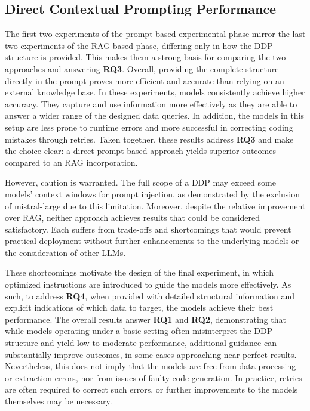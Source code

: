 \documentclass{DESSThesis}
\begin{document}
\subsection{Direct Contextual Prompting Performance}

The first two experiments of the prompt-based experimental phase mirror the last two experiments of the RAG-based phase, differing only in how the DDP structure is provided. This makes them a strong basis for comparing the two approaches and answering \textbf{RQ3}. Overall, providing the complete structure directly in the prompt proves more efficient and accurate than relying on an external knowledge base. In these experiments, models consistently achieve higher accuracy. They capture and use information more effectively as they are able to answer a wider range of the designed data queries. In addition, the models in this setup are less prone to runtime errors and more successful in correcting coding mistakes through retries. Taken together, these results address \textbf{RQ3} and make the choice clear: a direct prompt-based approach yields superior outcomes compared to an RAG incorporation.

However, caution is warranted. The full scope of a DDP may exceed some models' context windows for prompt injection, as demonstrated by the exclusion of mistral-large due to this limitation. Moreover, despite the relative improvement over RAG, neither approach achieves results that could be considered satisfactory. Each suffers from trade-offs and shortcomings that would prevent practical deployment without further enhancements to the underlying models or the consideration of other LLMs.

These shortcomings motivate the design of the final experiment, in which optimized instructions are introduced to guide the models more effectively. As such, to address \textbf{RQ4}, when provided with detailed structural information and explicit indications of which data to target, the models achieve their best performance. The overall results answer \textbf{RQ1} and \textbf{RQ2}, demonstrating that while models operating under a basic setting often misinterpret the DDP structure and yield low to moderate performance, additional guidance can substantially improve outcomes, in some cases approaching near-perfect results. Nevertheless, this does not imply that the models are free from data processing or extraction errors, nor from issues of faulty code generation. In practice, retries are often required to correct such errors, or further improvements to the models themselves may be necessary.
\end{document}
